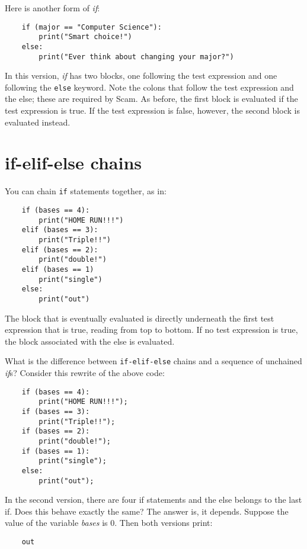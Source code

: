 Here is another form of {\it if}:

\begin{verbatim}
    if (major == "Computer Science"):
        print("Smart choice!")
    else:
        print("Ever think about changing your major?")
\end{verbatim}

In this version, {\it if} has two blocks, one following the
test expression and one following the {\tt else} keyword.
Note the colons that follow the test expression and the else;
these are required by Scam.
As before, the first block is evaluated if the test expression
is true. If the test expression is false, however,
the second block is evaluated instead.

\section{if-elif-else chains}

You can chain {\tt if} statements together, as in:

\begin{verbatim}
    if (bases == 4):
        print("HOME RUN!!!")
    elif (bases == 3):
        print("Triple!!")
    elif (bases == 2):
        print("double!")
    elif (bases == 1) 
        print("single")
    else:
        print("out")
\end{verbatim}

The block that is eventually evaluated is
directly underneath the first test expression
that is true, reading from top to bottom.
If no test expression is true, the block associated
with the else is evaluated.

What is the difference between {\tt if-elif-else}
chains and a sequence of
unchained {\it if}s? Consider this rewrite of the
above code:

\begin{verbatim}
    if (bases == 4):
        print("HOME RUN!!!");
    if (bases == 3):
        print("Triple!!");
    if (bases == 2):
        print("double!");
    if (bases == 1):
        print("single");
    else:
        print("out");
\end{verbatim}

In the second version, there are four if statements and
the else belongs to the last if. Does this behave exactly
the same? The answer is, it depends. Suppose the value
of the variable {\it bases} is 0. Then both versions print:

\begin{verbatim}
    out
\end{verbatim}

